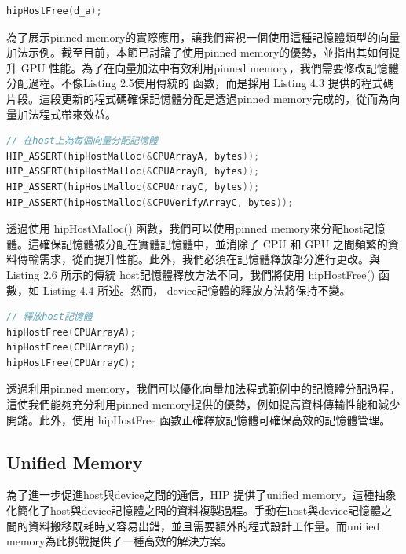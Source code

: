 \begin{lstlisting}[language=C, caption={釋放pinned memory}, label={2nd:example}]
hipHostFree(d_a);
\end{lstlisting}


為了展示pinned memory的實際應用，讓我們審視一個使用這種記憶體類型的向量加法示例。截至目前，本節已討論了使用pinned memory的優勢，並指出其如何提升 GPU 性能。為了在向量加法中有效利用pinned memory，我們需要修改記憶體分配過程。不像Listing 2.5使用傳統的  函數，而是採用 Listing 4.3 提供的程式碼片段。這段更新的程式碼確保記憶體分配是透過pinned memory完成的，從而為向量加法程式帶來效益。

\begin{lstlisting}[language=C, caption={在向量加法範例中使用host記憶體配置}, label={3rd:example}]
// 在host上為每個向量分配記憶體
HIP_ASSERT(hipHostMalloc(&CPUArrayA, bytes));
HIP_ASSERT(hipHostMalloc(&CPUArrayB, bytes));
HIP_ASSERT(hipHostMalloc(&CPUArrayC, bytes));
HIP_ASSERT(hipHostMalloc(&CPUVerifyArrayC, bytes));
\end{lstlisting}

透過使用 hipHostMalloc() 函數，我們可以使用pinned memory來分配host記憶體。這確保記憶體被分配在實體記憶體中，並消除了 CPU 和 GPU 之間頻繁的資料傳輸需求，從而提升性能。此外，我們必須在記憶體釋放部分進行更改。與 Listing 2.6 所示的傳統 host記憶體釋放方法不同，我們將使用 hipHostFree() 函數，如 Listing 4.4 所述。然而， device記憶體的釋放方法將保持不變。

\begin{lstlisting}[language=C, caption={釋放hostpinned memory}, label={4th:example}]
// 釋放host記憶體
hipHostFree(CPUArrayA);
hipHostFree(CPUArrayB);
hipHostFree(CPUArrayC);
\end{lstlisting}

透過利用pinned memory，我們可以優化向量加法程式範例中的記憶體分配過程。這使我們能夠充分利用pinned memory提供的優勢，例如提高資料傳輸性能和減少開銷。此外，使用 hipHostFree 函數正確釋放記憶體可確保高效的記憶體管理。

\subsection{Unified Memory}

為了進一步促進host與device之間的通信，HIP 提供了unified memory。這種抽象化簡化了host與device記憶體之間的資料複製過程。手動在host與device記憶體之間的資料搬移既耗時又容易出錯，並且需要額外的程式設計工作量。而unified memory為此挑戰提供了一種高效的解決方案。

